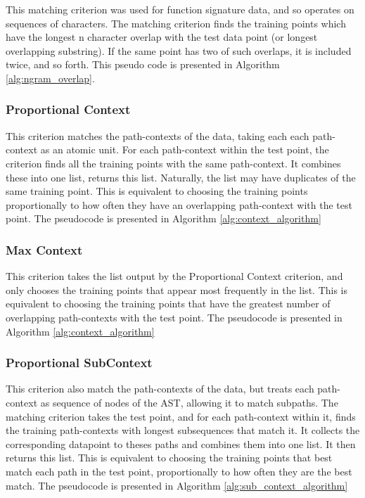 This matching criterion was used for function signature data, and so operates on sequences of characters. The matching criterion finds the training points which have the longest n character overlap with the test data point (or longest overlapping substring). If the same point has two of such overlaps, it is included twice, and so forth. This pseudo code is presented in Algorithm \ref{alg:ngram_overlap}.

\subsubsection{Proportional Context}

This criterion matches the path-contexts of the data, taking each each path-context as an atomic unit. 
For each path-context within the test point, the criterion finds all the training points with the same path-context. It combines these into one list, returns this list. Naturally, the list may have duplicates of the same training point. This is equivalent to choosing the training points proportionally to how often they have an overlapping path-context with the test point. The pseudocode is presented in Algorithm \ref{alg:context_algorithm} 


\subsubsection{Max Context}

This criterion takes the list output by the Proportional Context criterion, and only chooses the training points that appear most frequently in the list. This is equivalent to choosing the training points that have the greatest number of overlapping path-contexts with the test point. The pseudocode is presented in Algorithm \ref{alg:context_algorithm} 



\subsubsection{Proportional SubContext}

This criterion also match the path-contexts of the data, but treats each path-context as sequence of nodes of the AST, allowing it to match subpaths.
The matching criterion takes the test point, and for each path-context within it, finds the training path-contexts with longest subsequences that match it. It collects the corresponding datapoint to theses paths and combines them into one list. It then returns this list. This is equivalent to choosing the training points that best match each path in the test point, proportionally to how often they are the best match. The pseudocode is presented in Algorithm \ref{alg:sub_context_algorithm} 


